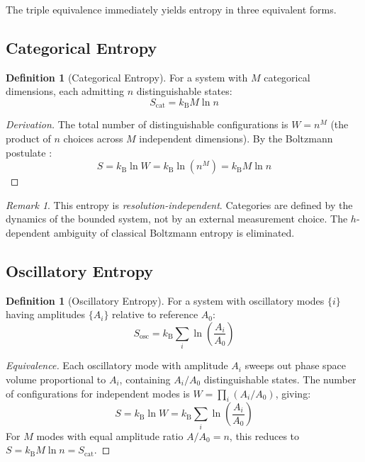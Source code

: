 \documentclass[twocolumn,10pt,a4paper]{article}
\theoremstyle{plain}
\theoremstyle{definition}
\newtheorem{definition}[theorem]{Definition}
\theoremstyle{remark}
\newtheorem{remark}[theorem]{Remark}
\newcommand{\kB}{k_{\mathrm{B}}}
\begin{document}
The triple equivalence immediately yields entropy in three equivalent forms.

\subsection{Categorical Entropy}

\begin{definition}[Categorical Entropy]
\label{def:cat_entropy}
For a system with $M$ categorical dimensions, each admitting $n$ distinguishable states:
\begin{equation}
    S_{\mathrm{cat}} = \kB M \ln n
\end{equation}
\end{definition}

\begin{proof}[Derivation]
The total number of distinguishable configurations is $W = n^M$ (the product of $n$ choices across $M$ independent dimensions). By the Boltzmann postulate \cite{boltzmann1877}:
\begin{equation}
    S = \kB \ln W = \kB \ln(n^M) = \kB M \ln n
\end{equation}
\end{proof}

\begin{remark}
This entropy is \emph{resolution-independent}. Categories are defined by the dynamics of the bounded system, not by an external measurement choice. The $h$-dependent ambiguity of classical Boltzmann entropy is eliminated.
\end{remark}

\subsection{Oscillatory Entropy}

\begin{definition}[Oscillatory Entropy]
For a system with oscillatory modes $\{i\}$ having amplitudes $\{A_i\}$ relative to reference $A_0$:
\begin{equation}
    S_{\mathrm{osc}} = \kB \sum_i \ln\!\left(\frac{A_i}{A_0}\right)
\end{equation}
\end{definition}

\begin{proof}[Equivalence]
Each oscillatory mode with amplitude $A_i$ sweeps out phase space volume proportional to $A_i$, containing $A_i/A_0$ distinguishable states. The number of configurations for independent modes is $W = \prod_i (A_i/A_0)$, giving:
\begin{equation}
    S = \kB \ln W = \kB \sum_i \ln\!\left(\frac{A_i}{A_0}\right)
\end{equation}
For $M$ modes with equal amplitude ratio $A/A_0 = n$, this reduces to $S = \kB M \ln n = S_{\mathrm{cat}}$.
\end{proof}
\end{document}
